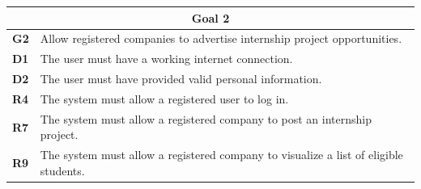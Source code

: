 \begin{table}[H]
    \centering
    \begin{tabular}{|l|m{10cm}|}
        \hline \multicolumn{2}{|c|}{\textbf{Goal 2}} \\
        \hline \textbf{G2} & Allow registered companies to advertise internship project opportunities. \\
        \hline \textbf{D1} & The user must have a working internet connection. \\
        \hline \textbf{D2} & The user must have provided valid personal information. \\
        \hline \textbf{R4} & The system must allow a registered user to log in. \\
        \hline \textbf{R7} & The system must allow a registered company to post an internship project. \\
        \hline \textbf{R9} & The system must allow a registered company to visualize a list of eligible students. \\

\end{tabular}
\end{table}
